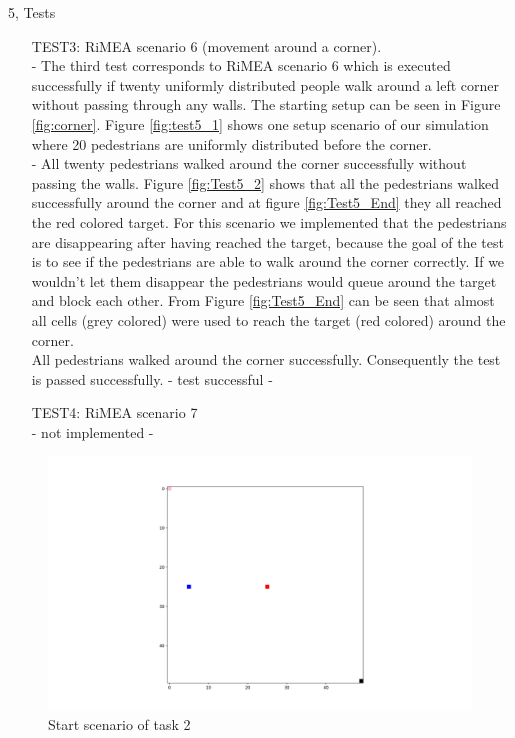 \documentclass[10pt,a4paper]{article}
\begin{document}
\begin{task}{5, Tests}
\begin{enumerate}
\item[TEST3:] RiMEA scenario 6 (movement around a corner).\\
- The third test corresponds to RiMEA scenario 6 which is executed successfully if twenty uniformly distributed people walk around a left corner without passing through any walls. The starting setup can be seen in Figure \ref{fig:corner}.
Figure \ref{fig:test5_1} shows one setup scenario of our simulation where 20 pedestrians are uniformly distributed before the corner.\\
- All twenty pedestrians walked around the corner successfully without passing the walls. Figure \ref{fig:Test5_2} shows that all the pedestrians walked successfully around the corner and at figure \ref{fig:Test5_End} they all reached the red colored target. For this scenario we implemented that the pedestrians are disappearing after having reached the target, because the goal of the test is to see if the pedestrians are able to walk around the corner correctly. If we wouldn't let them disappear the pedestrians would queue around the target and block each other.
From Figure \ref{fig:Test5_End} can be seen that almost all cells (grey colored) were used to reach the target (red colored) around the corner.
\\
All pedestrians walked around the corner successfully. Consequently the test is passed successfully.
- test successful - 
\item[TEST4:] RiMEA scenario 7\\
- not implemented - \\
\end{enumerate}
\end{task}
\newpage
\begin{figure}[h!]
    \centering
    \includegraphics[width=\textwidth]{pictures/2_Start.png}
    \caption{Start scenario of task 2}
    \label{fig:start_2}
\end{figure}
\end{document}
